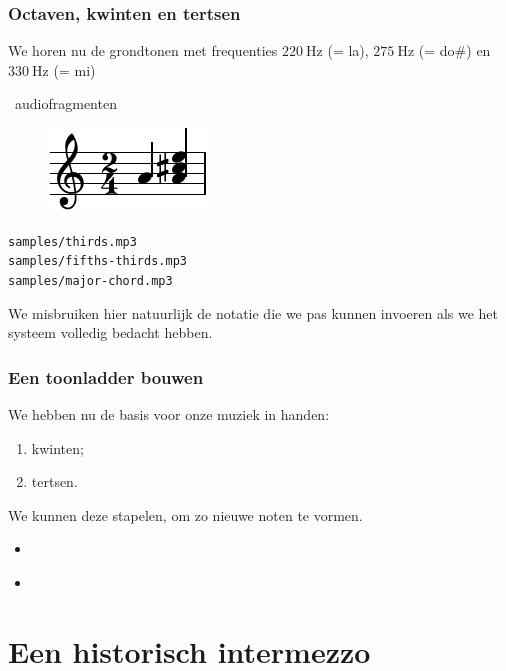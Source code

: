 \documentclass[compress, darktitle, framenumber, handout, totalframenumber]{beamer}
\begin{document}
\begin{frame}
  \frametitle{Octaven, kwinten en tertsen}

  We horen nu de grondtonen met frequenties $\SI{220}{\hertz}$ (= la), $\SI{275}{\hertz}$ (= do\#) en $\SI{330}{\hertz}$ (= mi)
  \begin{block}{\twonotes\ audiofragmenten}
    \begin{figure}
      \vspace{-.5cm} %
      \centering
      \includegraphics{scores/major-chord-cropped}
    \end{figure}

    \texttt{samples/thirds.mp3} \\
    \texttt{samples/fifths-thirds.mp3} \\
    \texttt{samples/major-chord.mp3}
  \end{block}

  \pause

  We misbruiken hier natuurlijk de notatie die we pas kunnen invoeren als we het systeem volledig bedacht hebben.
\end{frame}

\begin{frame}
  \frametitle{Een toonladder bouwen}

  We hebben nu de basis voor onze muziek in handen:
  \begin{enumerate}
    \item kwinten;
    \item tertsen.
  \end{enumerate}
  We kunnen deze stapelen, om zo nieuwe noten te vormen.
  \pause
  \begin{itemize}
    \item {}
    \item \hyperlink{tunings}{}
  \end{itemize}
\end{frame}


\section{Een historisch intermezzo}
\end{document}
